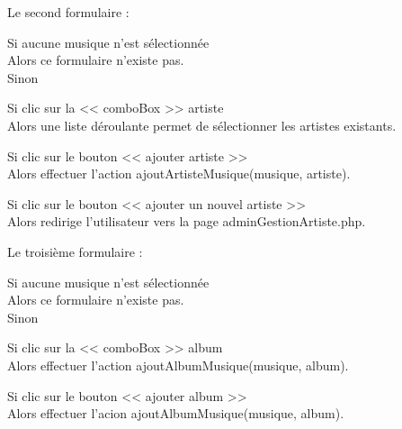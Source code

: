 			\begin{paragraphe}
				Le second formulaire :
			\end{paragraphe}

			\begin{paragraphe}
				Si aucune musique n'est sélectionnée \\
				Alors ce formulaire n'existe pas. \\
				Sinon
			\end{paragraphe}

			\begin{paragraphe}
				Si clic sur la << comboBox >> artiste \\
				Alors une liste déroulante permet de sélectionner les artistes existants.
			\end{paragraphe}

			\begin{paragraphe}
				Si clic sur le bouton << ajouter artiste >> \\
				Alors effectuer l'action ajoutArtisteMusique(musique, artiste).
			\end{paragraphe}

			\begin{paragraphe}
				Si clic sur le bouton << ajouter un nouvel artiste >> \\
				Alors redirige l'utilisateur vers la page adminGestionArtiste.php.
			\end{paragraphe}

			\begin{paragraphe}
				Le troisième formulaire :
			\end{paragraphe}

			\begin{paragraphe}
				Si aucune musique n'est sélectionnée \\
				Alors ce formulaire n'existe pas. \\
				Sinon
			\end{paragraphe}

			\begin{paragraphe}
				Si clic sur la << comboBox >> album \\
				Alors effectuer l'action ajoutAlbumMusique(musique, album).
			\end{paragraphe}

			\begin{paragraphe}
				Si clic sur le bouton << ajouter album >> \\
				Alors effectuer l'acion ajoutAlbumMusique(musique, album).
			\end{paragraphe}


